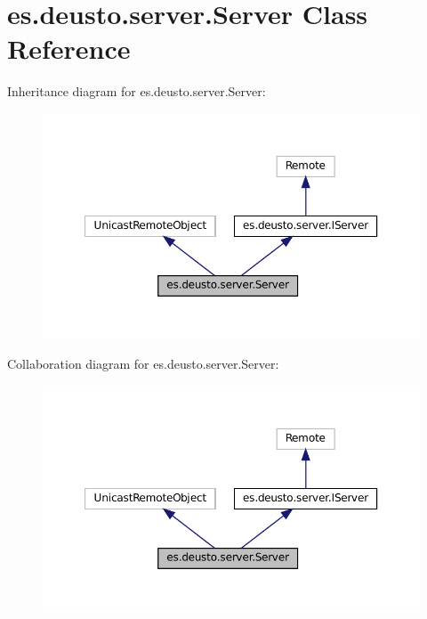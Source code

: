 \hypertarget{classes_1_1deusto_1_1server_1_1_server}{}\section{es.\+deusto.\+server.\+Server Class Reference}
\label{classes_1_1deusto_1_1server_1_1_server}


Inheritance diagram for es.\+deusto.\+server.\+Server\+:\nopagebreak
\begin{figure}[H]
\begin{center}
\leavevmode
\includegraphics[width=350pt]{classes_1_1deusto_1_1server_1_1_server__inherit__graph}
\end{center}
\end{figure}


Collaboration diagram for es.\+deusto.\+server.\+Server\+:\nopagebreak
\begin{figure}[H]
\begin{center}
\leavevmode
\includegraphics[width=350pt]{classes_1_1deusto_1_1server_1_1_server__coll__graph}
\end{center}
\end{figure}
